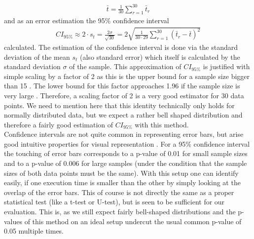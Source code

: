 \begin{align*}
	\bar{t} = \frac{1}{30} \sum_{r=1}^{30} \bar{t}_r
\end{align*}
and as an error estimation the 95\% confidence interval
\begin{align*}
	CI_\mathrm{95\%}
	\approx 2\cdot s_t = \frac{2\sigma}{\sqrt{30}} 
	=  2\sqrt{\frac{1}{30\cdot 29}\sum_{r=1}^{30}(\bar{t}_r - \bar{t})^2}
\end{align*}
calculated. The estimation of the confidence interval is done via the standard deviation of the mean $s_t$ (also standard error) which itself is calculated by the standard deviation $\sigma$ of the sample. This approximation of $CI_\mathrm{95\%}$ is justified with simple scaling by a factor of 2 as this is the upper bound for a sample size bigger than 15 \cite{CIs}. The lower bound for this factor approaches 1.96 if the sample size is very large \cite{CIs}. Therefore, a scaling factor of 2 is a very good estimator for 30 data points. We need to mention here that this identity technically only holds for normally distributed data, but we expect a rather bell shaped distribution and therefore a fairly good estimation of $CI_\mathrm{95\%}$ with this method.\\
Confidence intervals are not quite common in representing error bars, but arise good intuitive properties for visual representation \cite{touchingErrorbars}. For a 95\% confidence interval the touching of error bars corresponds to a p-value of 0.01 for small sample sizes and to a p-value of 0.006 for large samples (under the condition that the sample sizes of both data points must be the same). With this setup one can identify easily, if one execution time is smaller than the other by simply looking at the overlap of the error bars. This of course is not directly the same as a proper statistical test (like a t-test or U-test), but is seen to be sufficient for our evaluation. This is, as we still expect fairly bell-shaped distributions and the p-values of this method on an ideal setup undercut the usual common p-value of 0.05 multiple times. 



